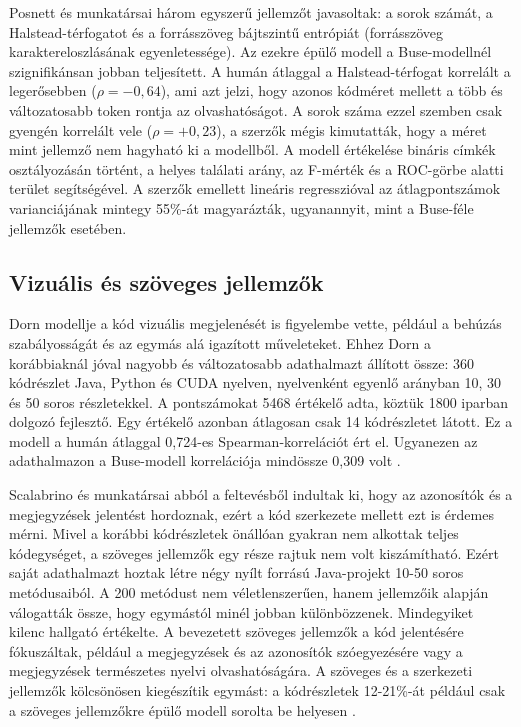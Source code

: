 \documentclass[
]{elteikthesis}[2024/04/26]
\begin{document}
Posnett és munkatársai három egyszerű jellemzőt javasoltak: a sorok számát, a
Halstead-térfogatot és a forrásszöveg bájtszintű entrópiát (forrásszöveg
karaktereloszlásának egyenletessége). Az ezekre épülő modell a Buse-modellnél
szignifikánsan jobban teljesített. A humán átlaggal a Halstead-térfogat
korrelált a legerősebben ($\rho = -0{,}64$), ami azt jelzi, hogy azonos kódméret
mellett a több és változatosabb token rontja az olvashatóságot. A sorok száma
ezzel szemben csak gyengén korrelált vele ($\rho = +0{,}23$), a szerzők mégis
kimutatták, hogy a méret mint jellemző nem hagyható ki a modellből. A modell
értékelése bináris címkék osztályozásán történt, a helyes találati arány, az
F-mérték és a ROC-görbe alatti terület segítségével. %
A szerzők emellett lineáris regresszióval az átlagpontszámok varianciájának
mintegy 55\%-át magyarázták, ugyanannyit, mint a Buse-féle jellemzők esetében.

\subsection{Vizuális és szöveges jellemzők}
\label{sec:related:models:visualandtext}

Dorn modellje a kód vizuális megjelenését is figyelembe vette, például a behúzás
szabályosságát és az egymás alá igazított műveleteket. Ehhez Dorn a korábbiaknál
jóval nagyobb és változatosabb adathalmazt állított össze: 360 kódrészlet Java,
Python és CUDA nyelven, nyelvenként egyenlő arányban 10, 30 és 50 soros
részletekkel. A pontszámokat 5468 értékelő adta, köztük 1800 iparban dolgozó
fejlesztő. Egy értékelő azonban átlagosan csak 14 kódrészletet látott. Ez a
modell a humán átlaggal 0,724-es Spearman-korrelációt ért el. Ugyanezen az
adathalmazon a Buse-modell korrelációja mindössze 0,309 volt
\cite{dorn2012general}.

Scalabrino és munkatársai abból a feltevésből indultak ki, hogy az azonosítók és
a megjegyzések jelentést hordoznak, ezért a kód szerkezete mellett ezt is
érdemes mérni. Mivel a korábbi kódrészletek önállóan gyakran nem alkottak teljes
kódegységet, a szöveges jellemzők egy része rajtuk nem volt kiszámítható. Ezért
saját adathalmazt hoztak létre négy nyílt forrású Java-projekt 10-50 soros
metódusaiból. A 200 metódust nem véletlenszerűen, hanem jellemzőik alapján
válogatták össze, hogy egymástól minél jobban különbözzenek. Mindegyiket kilenc
hallgató értékelte. A bevezetett szöveges jellemzők a kód jelentésére
fókuszáltak, például a megjegyzések és az azonosítók szóegyezésére vagy a
megjegyzések természetes nyelvi olvashatóságára. A szöveges és a szerkezeti
jellemzők kölcsönösen kiegészítik egymást: a kódrészletek 12-21\%-át például
csak a szöveges jellemzőkre épülő modell sorolta be helyesen
\cite{scalabrino2016improving}.
\end{document}
